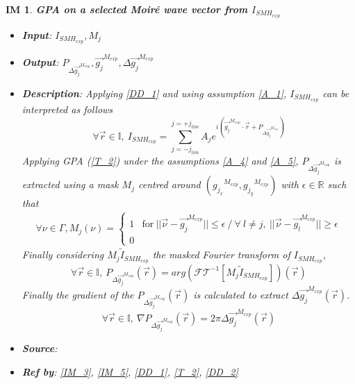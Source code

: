 \documentclass[12pt]{article}
\newtheorem{IM}{IM}
\begin{document}
\begin{IM}
\label{IM_2}
\noindent\colorbox{shadecolorIM}{\normalfont \textbf{GPA on a selected Moir{\'e} wave vector from $I_{SMH_{exp}}$}}
\normalfont
\begin{itemize}
\item \textbf{Input}: $I_{SMH_{exp}}, M_j$
\item \textbf{Output}: $P_{\Delta \overrightarrow{g_{j}}^{M_{exp}}}, \overrightarrow{g_{j}}^{M_{exp}}, \Delta \overrightarrow{g_{j}}^{M_{exp}}$
\item \textbf{Description}: Applying \cref{DD_1} and using assumption \cref{A_1}, $I_{SMH_{exp}}$ can be interpreted as follows
\begin{equation}
\forall \vec{r} \in \mathbb{I},\ I_{SMH_{exp}}=\sum_{j=-j_{lim}}^{j=+j_{lim}}A_je^{i(\overrightarrow{g_{j}}^{M_{exp}}\cdot\vec{r}+P_{\Delta \overrightarrow{g_{j}}^{M_{exp}}})}
\end{equation}
Applying GPA (\cref{T_2}) under the assumptions \cref{A_4} and \cref{A_5}, $P_{\Delta \overrightarrow{g_{j}}^{M_{exp}}}$ is extracted using a mask $M_j$ centred around $({g_{j_x}}^{M_{exp}},{g_{j_y}}^{M_{exp}})$ with $\epsilon \in \mathbb{R}$ such that
\begin{equation}
\begin{gathered}
\forall \nu \in \Gamma, M_j(\nu) = 
\begin{cases}
1 & \text{for} \ ||\vec{\nu}-\overrightarrow{g_{j}}^{M_{exp}}||\leq\epsilon \ / \ \forall \ l\neq j, \ ||\vec{\nu}-\overrightarrow{g_{l}}^{M_{exp}}||\geq \epsilon \\
0
\end{cases}
\end{gathered}
\end{equation}
Finally considering $M_j\widetilde{I}_{SMH_{exp}}$ the masked Fourier transform of $I_{SMH_{exp}}$,
\begin{equation}
\forall \vec{r} \in \mathbb{I},\ P_{\Delta \overrightarrow{g_{j}}^{M_{exp}}}(\vec{r})=arg(\mathcal{FT}^{-1}[M_j\widetilde{I}_{SMH_{exp}}])(\vec{r})
\end{equation}
Finally the gradient of the $P_{\Delta \overrightarrow{g_{j}}^{M_{exp}}}(\vec{r})$ is calculated to extract ${\Delta \overrightarrow{g_{j}}^{M_{exp}}}(\vec{r})$.
\begin{equation}
\forall \vec{r} \in \mathbb{I},\ \nabla P_{\Delta \overrightarrow{g_{j}}^{M_{exp}}}(\vec{r})=2\pi\Delta \overrightarrow{g_{j}}^{M_{exp}}(\vec{r})
\end{equation}
\item \textbf{Source}: \cite{Hytch1998}
\item \textbf{Ref by}: \cref{IM_3}, \cref{IM_5}, \cref{DD_1}, \cref{T_2}, \cref{DD_2}
\end{itemize}
\end{IM}
\end{document}
